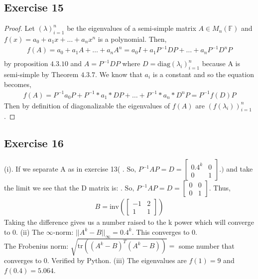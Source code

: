 \documentclass[11.5pt, letterpaper, bibtotoc,
    tablecaptionabove, figurecaptionabove]{article}
\begin{document}
\subsection*{Exercise 15}
\begin{proof}
Let $(\lambda)_{i=1}^n$ be the eigenvalues of a semi-simple matrix $A \in M_n(\mathbb F)$ and $f(x) = a_0 + a_1x + \dots + a_nx^n$ is a polynomial.  Then, 
\begin{align*}
	f(A) = a_0 + a_1A + \dots + a_nA^n = a_0I + a_1P^{-1}DP + \dots + a_nP^{-1}D^nP\\
\end{align*}
by proposition $4.3.10$ and $A=P^{-1}DP$ where $D= \text{diag}(\lambda_i)_{i=1}^n$ because A is semi-simple by Theorem $4.3.7$.  We know that $a_i$ is a constant and so the equation becomes,
\begin{align*}
	f(A) =  P^{-1}a_0P + P^{-1}*a_1*DP + \dots + P^{-1}*a_n*D^nP = P^{-1}f(D)P
\end{align*}
Then by definition of diagonalizable the eigenvalues of $f(A)$ are $(f(\lambda_i))_{i=1}^n$.
\end{proof}

\subsection*{Exercise 16}
(i). If we separate A as in exercise 13(    $\text{. So, } P^{-1} A P = D =
    	\begin{bmatrix}
        		0.4^k & 0\\
        		0 & 1
    \end{bmatrix}.)$ 
   and take the limit we see that the D matrix is:
    $\text{. So, } P^{-1} A P = D =
    	\begin{bmatrix}
        		0 & 0\\
        		0 & 1
    \end{bmatrix}.$
    Thus,
    \begin{align*}
    	B = \text{inv}(\begin{bmatrix}
		-1 & 2 \\
		1 & 1
		\end{bmatrix})
\end{align*}
Taking the difference gives us a number raised to the k power which will converge to 0.
(ii)
The $\infty$-norm:  $||A^k - B||_{\infty} = 0.4^k$.  This converges to 0.  \\
The Frobenius norm: $\sqrt{\text{tr}((A^k-B)^T(A^k -B))} =$ some number that converges to 0.  Verified by Python.
(iii)
The eigenvalues are $f(1) = 9$ and $f(0.4) = 5.064$.
\end{document}

